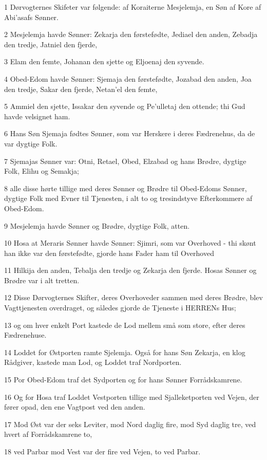 \par 1 Dørvogternes Skifeter var følgende: af Koraiterne Mesjelemja, en Søn af Kore af Abi'asafs Sønner.
\par 2 Mesjelemja havde Sønner: Zekarja den førstefødte, Jediael den anden, Zebadja den tredje, Jatniel den fjerde,
\par 3 Elam den femte, Johanan den sjette og Eljoenaj den syvende.
\par 4 Obed-Edom havde Sønner: Sjemaja den førstefødte, Jozabad den anden, Joa den tredje, Sakar den fjerde, Netan'el den femte,
\par 5 Ammiel den sjette, Issakar den syvende og Pe'ulletaj den ottende; thi Gud havde velsignet ham.
\par 6 Hans Søn Sjemaja fødtes Sønner, som var Herskere i deres Fædrenehus, da de var dygtige Folk.
\par 7 Sjemajas Sønner var: Otni, Retael, Obed, Elzabad og hans Brødre, dygtige Folk, Elihu og Semakja;
\par 8 alle disse hørte tillige med deres Sønner og Brødre til Obed-Edoms Sønner, dygtige Folk med Evner til Tjenesten, i alt to og tresindstyve Efterkommere af Obed-Edom.
\par 9 Mesjelemja havde Sønner og Brødre, dygtige Folk, atten.
\par 10 Hosa at Meraris Sønner havde Sønner: Sjimri, som var Overhoved - thi skønt han ikke var den førstefødte, gjorde hans Fader ham til Overhoved
\par 11 Hilkija den anden, Tebalja den tredje og Zekarja den fjerde. Hosas Sønner og Brødre var i alt tretten.
\par 12 Disse Dørvogternes Skifter, deres Overhoveder sammen med deres Brødre, blev Vagttjenesten overdraget, og således gjorde de Tjeneste i HERRENs Hus;
\par 13 og om hver enkelt Port kastede de Lod mellem små som store, efter deres Fædrenehuse.
\par 14 Loddet for Østporten ramte Sjelemja. Også for hans Søn Zekarja, en klog Rådgiver, kastede man Lod, og Loddet traf Nordporten.
\par 15 Por Obed-Edom traf det Sydporten og for hans Sønner Forrådskamrene.
\par 16 Og for Hosa traf Loddet Vestporten tillige med Sjalleketporten ved Vejen, der fører opad, den ene Vagtpost ved den anden.
\par 17 Mod Øst var der seks Leviter, mod Nord daglig fire, mod Syd daglig tre, ved hvert af Forrådskamrene to,
\par 18 ved Parbar mod Vest var der fire ved Vejen, to ved Parbar.
